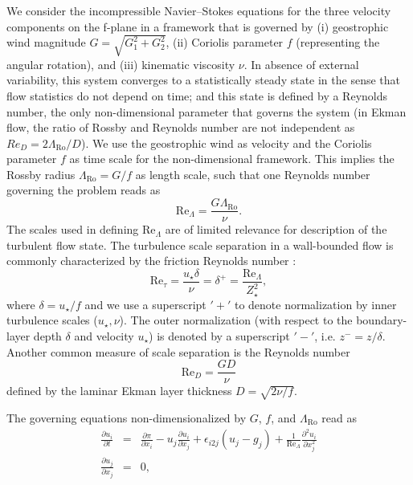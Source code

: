 \documentclass[smallcondensed,final]{svjour3}
\newcommand{\p}{\partial}
\newcommand{\RO}{\mathrm{Ro}}
\newcommand{\RE}{\mathrm{Re}}
\newcommand{\LR}{\Lambda_\RO}
\begin{document}
%
\par
%
We consider the incompressible Navier--Stokes equations for the three velocity components on the f-plane in a framework
that is governed by %
(i)   geostrophic wind magnitude $G=\sqrt{G_1^2+G_2^2}$,
(ii)  Coriolis parameter $f$ (representing the angular rotation), and
(iii) kinematic viscosity $\nu$.
%
In absence of external variability, this system converges to a statistically steady state in the sense that flow
statistics do not depend on time; and this state is defined by a Reynolds number,
the only non-dimensional parameter that governs the system (in Ekman flow, the ratio of Rossby and Reynolds number 
are not independent as $Re_D=2\Lambda_\text{Ro} / D$).
%
We use the geostrophic wind as velocity and the Coriolis parameter $f$ as time scale for the non-dimensional
framework.
%
This implies the Rossby radius $\LR=G/f$ as length scale, such that one Reynolds number
governing the problem reads as
%
\begin{equation}
  \RE_\Lambda=\frac{G \LR }{\nu}. 
\end{equation}
%
The scales used in defining $\RE_\Lambda$ are of limited relevance for description of the turbulent flow state.
%
The turbulence scale separation in a wall-bounded flow is commonly characterized by the friction Reynolds number
\citep{jimenez:ARF2012}:
\begin{equation}
  \RE_\tau = \frac{u_\star\delta}{\nu} = \delta^+ = \frac{\RE_\Lambda}{Z_\star^2}, 
\end{equation}
where $\delta=u_\star/f$ and we use a superscript $'+'$ to denote normalization by inner turbulence
scales ($u_\star, \nu$). 
%
The outer normalization (with respect to the boundary-layer depth $\delta$ and velocity $u_\star$) is denoted 
by a superscript $'-'$, i.e. $z^-=z/\delta$.  
%
Another common measure of scale separation is the Reynolds number 
\begin{equation}
  \RE_D = \frac{G D}{\nu} 
\end{equation}  defined by the laminar Ekman layer thickness $D=\sqrt{2\nu/f}$.
%
\par
%
The governing equations  non-dimensionalized by $G$, $f$, and $\Lambda_\mathrm{\RO}$ read as 
\begin{subequations} 
\label{eqn:governing} 
\begin{eqnarray}
  \frac{\partial u_i}{\partial t} &=& \frac{\p \pi}{\p x_i} - u_j \frac{\p u_i}{\p x_j} + \epsilon_{i2j} (u_j -g_j)   + \frac{1}{\RE_\Lambda} \frac{\p^2 u_i}{\p x_{j}^2} \\ 
  \frac{\partial u_j}{\partial x_j} &=& 0,   
\end{eqnarray} 
\end{subequations}
\end{document}

